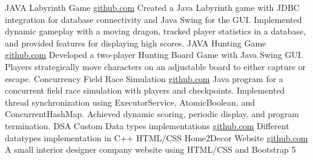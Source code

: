 \documentclass[9pt]{developercv} %
\begin{document}
\begin{entrylist}
    \entry
		{JAVA}
		{Labyrinth Game}
		{\href{https://github.com/afzalaman/Labyrinth-Game}
        {github.com}}
		{Created a Java Labyrinth game with JDBC integration for database connectivity and Java Swing for the GUI. Implemented dynamic gameplay with a moving dragon, tracked player statistics in a database, and provided features for displaying high scores.}
    \entry
		{JAVA}
		{Hunting Game}
		{\href{https://github.com/afzalaman/Hunting-Game}
        {github.com}}
		{Developed a two-player Hunting Board Game with Java Swing GUI. Players strategically move characters on an adjustable board to either capture or escape.}
    \entry
		{Concurrency}
		{Field Race Simulation}
		{\href{https://github.com/afzalaman/FieldRace}
        {github.com}}
		{Java program for a concurrent field race simulation with players and checkpoints. Implemented thread synchronization using ExecutorService, AtomicBoolean, and ConcurrentHashMap. Achieved dynamic scoring, periodic display, and program termination.}
    \entry
		{DSA}
		{Custom Data types implementations}
		{\href{https://github.com/afzalaman/DataTypes-Implemetation}
        {github.com}}
		{Different datatypes implementation in C++}
    \entry
		{HTML/CSS}
		{Home2Decor Website}
		{\href{https://github.com/afzalaman/Mini-Website}
        {github.com}}
		{A small interior designer company website using HTML/CSS and Bootstrap 5}
  
\end{entrylist}
\end{document}
